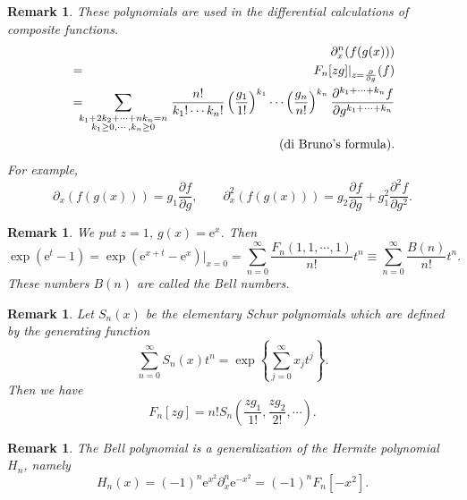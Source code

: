 \documentclass[makeidx,12pt,openany]{report}
\newtheorem{rmk}[df]{Remark}
\begin{document}
\begin{rmk}
These polynomials are used in the differential calculations of composite 
functions. 
\begin{eqnarray}
 && \partial_x^n (f(g(x))) \nonumber\\
 &=& F_n[zg]|_{z=\frac{\partial}{\partial g}}(f) \\
 &=& \hspace{-5mm}
    \sum_{{\scriptstyle k_1+2k_2+ \cdots +nk_n=n}\atop
          {\scriptstyle k_1 \geq 0,\cdots ,k_n \geq 0}}
         \frac{n!}{k_1! \cdots k_n!} 
         \left(
          \frac{g_1}{1!}
         \right)^{k_1}
            \cdots
         \left(
          \frac{g_n}{n!}
         \right)^{k_n}
         \frac{\partial^{k_1+\cdots +k_n} f}{\partial g^{k_1+\cdots +k_n}} \\
 && \hspace*{5cm} \mbox{(di Bruno's formula)}. \nonumber
\end{eqnarray}
For example, 
\begin{equation}
 \partial_x (f(g(x)))=g_1 \frac{\partial f}{\partial g}, \qquad 
 \partial_x^2 (f(g(x)))=g_2 \frac{\partial f}{\partial g}
  +g_1^2 \frac{\partial^2 f}{\partial g^2}. 
\end{equation}
\end{rmk}
\begin{rmk}
We put $z=1$, $g(x)=\mbox{e}^x$. Then 
\begin{equation}
 \exp (\mbox{e}^t-1)=\exp (\mbox{e}^{x+t}-\mbox{e}^x)|_{x=0}
  =\sum_{n=0}^{\infty}\frac{F_n(1,1,\cdots,1)}{n!}t^n
  \equiv \sum_{n=0}^{\infty}\frac{B(n)}{n!}t^n. 
\end{equation}
These numbers $B(n)$ are called the Bell numbers. 
\end{rmk}
\begin{rmk}
Let $S_n(x)$ be the elementary Schur polynomials which are defined by 
the generating function 
\begin{equation}
 \sum_{n=0}^{\infty}S_n(x)t^n
  =\exp \left\{ \sum_{j=0}^{\infty}x_j t^j \right\} . 
\end{equation}
Then we have 
\begin{equation}
 F_n[zg]=n! S_n \left( \frac{zg_1}{1!},\frac{zg_2}{2!},\cdots \right) . 
\end{equation}
\end{rmk}
\begin{rmk}
The Bell polynomial is a generalization of the Hermite polynomial $H_n$, 
namely 
\begin{equation}
 H_n(x)=(-1)^n \mbox{e}^{x^2} \partial_x^n \mbox{e}^{-x^2}
  =(-1)^n F_n[-x^2]. 
\end{equation}
\end{rmk}
\end{document}
